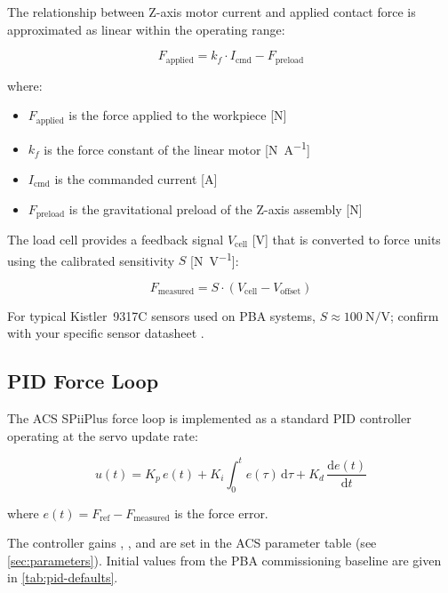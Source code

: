The relationship between Z-axis motor current and applied contact force is
approximated as linear within the operating range:

\begin{equation}
  F_{\text{applied}} = k_f \cdot I_{\text{cmd}} - F_{\text{preload}}
  \label{eq:force-model}
\end{equation}

\noindent where:
\begin{itemize}[noitemsep, topsep=4pt]
  \item $F_{\text{applied}}$ is the force applied to the workpiece [\si{\newton}]
  \item $k_f$ is the force constant of the linear motor [\si{\newton\per\ampere}]
  \item $I_{\text{cmd}}$ is the commanded current [\si{\ampere}]
  \item $F_{\text{preload}}$ is the gravitational preload of the Z-axis assembly [\si{\newton}]
\end{itemize}

The load cell provides a feedback signal $V_{\text{cell}}$ [\si{\volt}] that is
converted to force units using the calibrated sensitivity $S$ [\si{\newton\per\volt}]:

\begin{equation}
  F_{\text{measured}} = S \cdot (V_{\text{cell}} - V_{\text{offset}})
  \label{eq:sensor-model}
\end{equation}

For typical Kistler~9317C sensors used on PBA systems, $S \approx
\SI{100}{\newton\per\volt}$; confirm with your specific sensor datasheet
\cite{kistler_sensor_2022}.


\subsection{PID Force Loop}
\label{sec:background:pid}

The ACS SPiiPlus force loop is implemented as a standard PID controller
operating at the servo update rate:

\begin{equation}
  u(t) = K_p \, e(t) + K_i \int_0^t e(\tau)\,\mathrm{d}\tau
         + K_d \,\frac{\mathrm{d}e(t)}{\mathrm{d}t}
  \label{eq:pid}
\end{equation}

\noindent where $e(t) = F_{\text{ref}} - F_{\text{measured}}$ is the force error.

The controller gains , , and  are
set in the ACS parameter table (see \cref{sec:parameters}).
Initial values from the PBA commissioning baseline are given in
\cref{tab:pid-defaults}.

